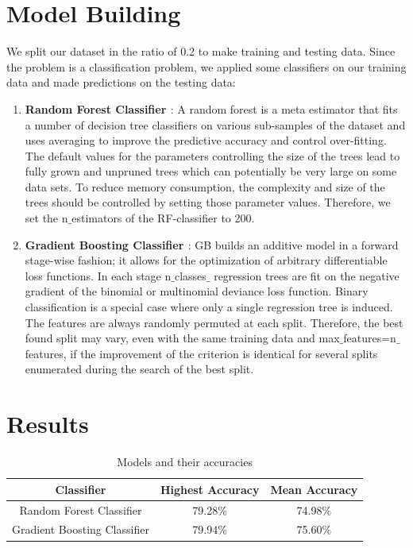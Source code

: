 \documentclass[conference]{IEEEtran}
\begin{document}
\section{Model Building}
We split our dataset in the ratio of 0.2 to make training and testing data.
Since the problem is a classification problem, we applied some classifiers on our training data and made predictions on the testing data: 
\begin{enumerate}
	\item \textbf{Random Forest Classifier \cite{rf}} : A random forest is a meta estimator that fits a number of decision tree classifiers on various sub-samples of the dataset and uses averaging to improve the predictive accuracy and control over-fitting. \\
	The default values for the parameters controlling the size of the trees lead to fully grown and unpruned trees which can potentially be very large on some data sets. To reduce memory consumption, the complexity and size of the trees should be controlled by setting those parameter values. Therefore, we set the n$\_$estimators of the RF-classifier to 200.\\
	\item \textbf{Gradient Boosting Classifier \cite{rf}} :  GB builds an additive model in a forward stage-wise fashion; it allows for the optimization of arbitrary differentiable loss functions. In each stage n$\_$classes$\_$ regression trees are fit on the negative gradient of the binomial or multinomial deviance loss function. Binary classification is a special case where only a single regression tree is induced.\\
	The features are always randomly permuted at each split. Therefore, the best found split may vary, even with the same training data and max$\_$features=n$\_$features, if the improvement of the criterion is identical for several splits enumerated during the search of the best split.
\end{enumerate}

\newpage
\section{Results}
\begin{table}[H]
	\begin{center}
		\caption{Models and their accuracies}
		\begin{tabular}{|c|c|c|}
			\hline
			\textbf{Classifier} & \textbf{Highest Accuracy} & \textbf{Mean Accuracy}\\
			\hline
			 Random Forest Classifier &  79.28$\%$ & 74.98$\%$\\
			 \hline
			 Gradient Boosting Classifier & 79.94$\%$ & 75.60$\%$\\
			 \hline			
		\end{tabular}
	\end{center}
\end{table}



\end{document}

